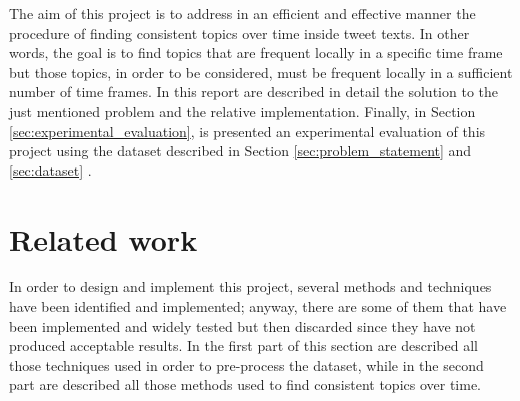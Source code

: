 The aim of this project is to address in an efficient and effective manner the procedure of finding consistent topics over time inside tweet texts. In other words, the goal is to find topics that are frequent locally in a specific time frame but those topics, in order to be considered, must be frequent locally in a sufficient number of time frames. In this report are described in detail the solution to the just mentioned problem and the relative implementation. Finally, in Section \ref{sec:experimental_evaluation}, is presented an experimental evaluation of this project using the dataset described in Section \ref{sec:problem_statement} and \ref{sec:dataset} \cite{covid19-tweets-dataset}.

\section{Related work}
\label{sec:related_word}
In order to design and implement this project, several methods and techniques have been identified and implemented; anyway, there are some of them that have been implemented and widely tested but then discarded since they have not produced acceptable results. In the first part of this section are described all those techniques used in order to pre-process the dataset, while in the second part are described all those methods used to find consistent topics over time. 

